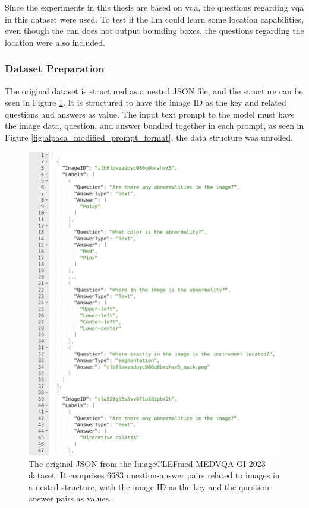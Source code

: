         Since the experiments in this thesis are based on \gls{vqa}, the questions regarding \gls{vqa} in this dataset were used. To test if the \gls{llm} could learn some location capabilities, even though the \gls{cnn} does not output bounding boxes, the questions regarding the location were also included. 
        

        \subsubsection{Dataset Preparation}
        
        The original dataset is structured as a nested JSON file, and the structure can be seen in Figure \ref{fig:colon_vqa_original_json}.
        It is structured to have the image ID as the key and related questions and answers as value. The input text prompt to the model must have the image data, question, and answer bundled together in each prompt, as seen in Figure \ref{fig:alpaca_modified_prompt_format}, the data structure was unrolled. 


        \begin{figure}[htb]
            \centering
            \centerline{
            \includegraphics[width=1.2\textwidth]{images/colon_vqa_original_json.png}}
            \caption[The original JSON for the ImageCLEFmed-MEDVQA-GI-2023 dataset.]{The original JSON from the ImageCLEFmed-MEDVQA-GI-2023 dataset. It comprises 6683 question-answer pairs related to images in a nested structure, with the image ID as the key and the question-answer pairs as values.}
            \label{fig:colon_vqa_original_json}
        \end{figure}


